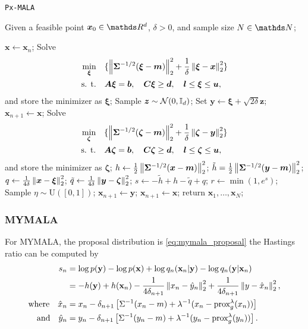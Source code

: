 \documentclass[10pt]{article}
\numberwithin{equation}{section}
\begin{document}
\begin{algorithm}[H]
\caption{\texttt{Px-MALA}}
Given a feasible point $\bm x_0 \in \R^d$, $\delta > 0$, and sample size $N \in \N$;
\begin{algorithmic}[2]\label{alg:pxmala}
\State $\bm x \gets \bm x_n$;
\State Solve
\begin{align*}
\min_{\bm \xi} & \quad \lbrace \left\|\bm \Sigma^{-1/2}(\bm \xi - \bm m)\right\|_2^2 + \frac{1}{\delta} \left\|\bm \xi - \bm x\right\|_2^2 \rbrace \\
\text{s. t.} & \quad \bm A \bm \xi = \bm b, \quad \bm C \bm \xi \geq \bm d, \quad \bm l \leq \bm \xi \leq \bm u,
\end{align*}
and store the minimizer as $\bm \xi$;
\State Sample $\bm z \sim \mathcal{N}(0, \mathbb{I}_d)$;
\State Set $\bm y \gets \bm \xi + \sqrt{2 \delta} \bm z$;
\State $\bm x_{n+1} \gets \bm x$;
\Else
\State Solve
\begin{align*}
\min_{\bm \zeta} & \quad \lbrace \left\|\bm \Sigma^{-1/2}(\bm \zeta - \bm m)\right\|_2^2 + \frac{1}{\delta} \left\|\bm \zeta - \bm y\right\|_2^2 \rbrace \\
\text{s. t.} & \quad \bm A \bm \zeta = \bm b, \quad \bm C \bm \zeta \geq \bm d, \quad \bm l \leq \bm \zeta \leq \bm u,
\end{align*}
and store the minimizer as $\bm \zeta$;
\State $h \gets \frac{1}{2} \left\|\bm \Sigma^{-1/2}(\bm x - \bm m)\right\|_2^2$;
\State $\tilde h = \frac{1}{2} \left\|\bm \Sigma^{-1/2}(\bm y - \bm m)\right\|_2^2$;
\State $q \gets \frac{1}{4 \delta}\left\|\bm x - \bm \xi\right\|_2^2$;
\State $\tilde q \gets \frac{1}{4 \delta}\left\|\bm y - \bm \zeta\right\|_2^2$;
\State $s \gets - \tilde h + h - \tilde q + q$;
\State $r \gets \min(1, e^s)$;
\State Sample $\eta \sim \mathrm{U}([0,1])$;
\State $\bm x_{n+1} \gets \bm y$;
\Else
\State $\bm x_{n+1} \gets \bm x$;
\EndIf
\EndIf
\EndFor
\State return $\bm x_1, \ldots, \bm x_N$;
\end{algorithmic}
\end{algorithm}


\subsubsection*{MYMALA}

For MYMALA, the proposal distribution is \eqref{eq:mymala_proposal} the Hastings ratio can be computed by
\begin{align*}
s_n & = \log p(\mathbf{y}) - \log p(\mathbf{x}) + \log q_n(\mathbf{x}_n | \mathbf{y}) - \log q_n(\mathbf{y} | \mathbf{x}_n) \\
& = -h(\mathbf{y}) + h(\mathbf{x}_n) - \frac{1}{4 \delta_{n+1}} \left\|x_n - \hat y_n\right\|_2^2 + \frac{1}{4 \delta_{n+1}} \left\|y - \hat x_n\right\|_2^2, \\ \text{where} \quad \hat x_n & = x_n - \delta_{n+1} \left[\Sigma^{-1}(x_n - m) + \lambda^{-1}(x_n - \text{prox}_{g}^{\lambda}(x_n)) \right]\\
\text{and} \quad \hat y_n & = y_n - \delta_{n+1} \left[\Sigma^{-1}(y_n - m) + \lambda^{-1}(y_n - \text{prox}_{g}^{\lambda}(y_n)) \right].
\end{align*}
\end{document}
